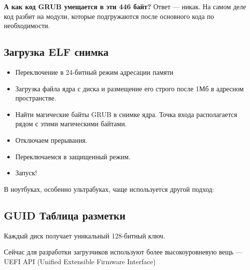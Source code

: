 \textbf{А как код GRUB умещается в эти 446 байт?}
Ответ --- никак. На самом деле код разбит на модули, которые подгружаются после
основного кода по необходимости.

\subsection{Загрузка ELF снимка}

\begin{itemize}
	\item Переключение в 24-битный режим адресации памяти
	\item Загрузка файла ядра с диска и размещение его строго после 1Мб 
	в адресном пространстве. 
	\item Найти магические байты GRUB в снимке ядра. Точка входа располагается рядом
	с этими магическими байтами.
	\item Отключаем прерывания.
	\item Переключаемся в защищенный режим.
	\item Запуск!
\end{itemize}

В ноутбуках, особенно ультрабуках, чаще используется другой подход:
\subsection{GUID Таблица разметки}

Каждый диск получает уникальный 128-битный ключ.

Сейчас для разработки загрузчиков используют более высокоуровневую вещь --- 
UEFI API (Unified Extensible Firmware Interface)

